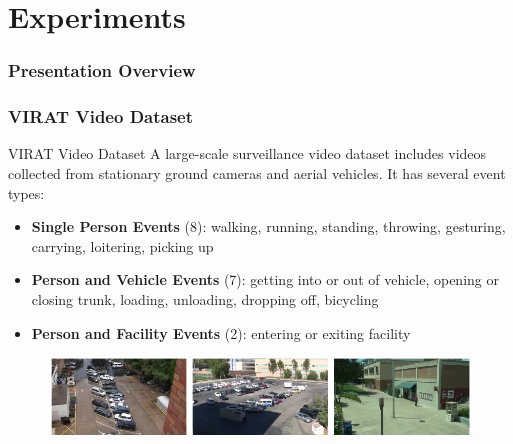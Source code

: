 \documentclass[13.5pt,aspecratio=169, xcolor=dvipsnames]{beamer}
\begin{document}
\section{Experiments}

\begin{frame}
    \doublespacing
        \frametitle{Presentation Overview} %
        
        \tableofcontents[currentsection] %
\end{frame}


\begin{frame}
    \onehalfspacing
        \frametitle{VIRAT Video Dataset}
       
        \begin{block}{VIRAT Video Dataset}
            A large-scale surveillance video dataset includes videos collected from
            stationary ground cameras and aerial vehicles. It has several event types:
        
            \begin{itemize}
                \item \textbf{Single Person Events} (8): walking, running, standing,
                throwing, gesturing, carrying, loitering, picking up
                \item \textbf{Person and Vehicle Events} (7): getting into or out of
                vehicle, opening or closing trunk, loading, unloading, dropping off, bicycling
                \item \textbf{Person and Facility Events} (2): entering or exiting facility
            \end{itemize}
        \end{block}
            \begin{figure}[h]
                \centering
                \includegraphics[width=\linewidth]{VIRAT_datasets.png}
            \end{figure}

    \end{frame}
\end{document}

